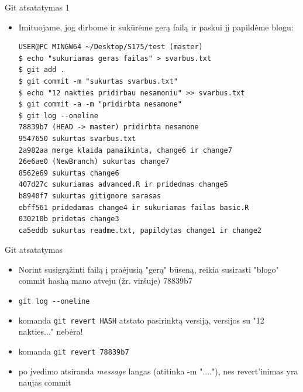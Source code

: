 \documentclass[11pt,xcolor=table]{beamer}
\begin{document}

\begin{frame}[fragile]{Git atsatatymas 1}
\begin{itemize}
\item Imituojame, jog dirbome ir sukūrėme gerą failą ir paskui jį papildėme blogu:
\begin{lstlisting}
USER@PC MINGW64 ~/Desktop/S175/test (master)
$ echo "sukuriamas geras failas" > svarbus.txt
$ git add .
$ git commit -m "sukurtas svarbus.txt"
$ echo "12 nakties pridirbau nesamoniu" >> svarbus.txt
$ git commit -a -m "pridirbta nesamone"
$ git log --oneline
78839b7 (HEAD -> master) pridirbta nesamone
9547650 sukurtas svarbus.txt
2a982aa merge klaida panaikinta, change6 ir change7
26e6ae0 (NewBranch) sukurtas change7
8562e69 sukurtas change6
407d27c sukuriamas advanced.R ir pridedmas change5
b8940f7 sukurtas gitignore sarasas
ebff561 pridedamas change4 ir sukuriamas failas basic.R
030210b pridetas change3
ca5eddb sukurtas readme.txt, papildytas change1 ir change2
\end{lstlisting}
\end{itemize}
\end{frame}



\begin{frame}[fragile]{Git atsatatymas}
\begin{itemize}
\item Norint susigrąžinti failą į praėjusią "gerą" būseną, reikia susirasti "blogo" commit hashą  mano atveju (žr. viršuje) 78839b7
\item \colorbox{listinggray}{\lstinline|git log --oneline|}
\item komanda \colorbox{listinggray}{\lstinline|git revert HASH|} atstato pasirinktą versiją, versijos su "12 nakties..." nebėra!
\item komanda \colorbox{listinggray}{\lstinline|git revert 78839b7|}
\item po įvedimo atsiranda \textit{message} langas (atitinka -m "...."), nes revert'inimas yra naujas commit
\end{itemize}
\end{frame}
\end{document}
